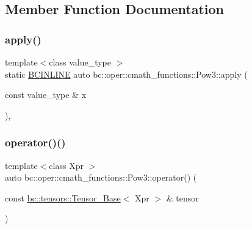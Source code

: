 \subsection{Member Function Documentation}
\mbox{\label{structbc_1_1oper_1_1cmath__functions_1_1Pow3_a703f46549919b7bd1d6880c13c240d76}} 
\subsubsection{\texorpdfstring{apply()}{apply()}}
{\footnotesize\ttfamily template$<$class value\+\_\+type $>$ \\
static \hyperlink{common_8h_a6699e8b0449da5c0fafb878e59c1d4b1}{B\+C\+I\+N\+L\+I\+NE} auto bc\+::oper\+::cmath\+\_\+functions\+::\+Pow3\+::apply (\begin{DoxyParamCaption}\item[{const value\+\_\+type \&}]{x }\end{DoxyParamCaption})\hspace{0.3cm}{\ttfamily [inline]}, {\ttfamily [static]}}

\mbox{\label{structbc_1_1oper_1_1cmath__functions_1_1Pow3_ac310abee8b6a40eb5bf6c2bed2395107}} 
\subsubsection{\texorpdfstring{operator()()}{operator()()}\hspace{0.1cm}{\footnotesize\ttfamily [1/3]}}
{\footnotesize\ttfamily template$<$class Xpr $>$ \\
auto bc\+::oper\+::cmath\+\_\+functions\+::\+Pow3\+::operator() (\begin{DoxyParamCaption}\item[{const \hyperlink{classbc_1_1tensors_1_1Tensor__Base}{bc\+::tensors\+::\+Tensor\+\_\+\+Base}$<$ Xpr $>$ \&}]{tensor }\end{DoxyParamCaption})\hspace{0.3cm}{\ttfamily [inline]}}

